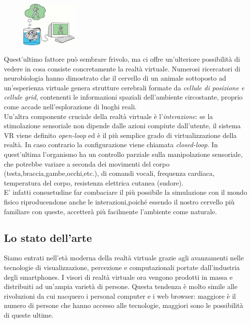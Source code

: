 \begin{figure} %
	\centering
	\includegraphics[width=0.25\textwidth]{figure/VRfool}
\end{figure}
Quest'ultimo fattore può sembrare frivolo, ma ci offre un'ulteriore possibilità di vedere in cosa consiste concretamente la realtà virtuale. Numerosi ricercatori di neurobiologia hanno dimostrato che il cervello di un animale sottoposto ad un'esperienza virtuale \mbox{genera} strutture cerebrali formate da \textit{cellule di posizione e cellule grid}, contenenti le informazioni spaziali dell'ambiente circostante, proprio come accade nell'esplorazione di luoghi reali.\\
Un'altra componente cruciale della realtà virtuale è l'\textit{interazione}: se la stimolazione sensoriale non dipende dalle azioni compiute dall'utente, il sistema VR viene definito \textit{open-loop} ed è il più semplice grado di virtualizzazione della realtà. In caso contrario la configurazione viene chiamata \textit{closed-loop}. In quest'ultima l'organismo ha un controllo parziale sulla manipolazione sensoriale, che potrebbe variare a seconda dei movimenti del corpo (testa,braccia,gambe,occhi,etc.), di comandi vocali, frequenza cardiaca, temperatura del corpo, resistenza elettrica cutanea (sudore).\\ E' infatti consuetudine far combaciare il più possibile la simulazione con il mondo fisico riproducendone anche le interazioni,poiché essendo il nostro cervello più familiare con queste, accetterà più facilmente l'ambiente come naturale.
\newpage

\subsection{Lo stato dell'arte}

Siamo entrati nell'età moderna della realtà virtuale grazie agli avanzamenti nelle tecnologie di visualizzazione, percezione e computazionali portate dall'industria degli smartphones. I visori di realtà virtuale ora vengono prodotti in massa e distribuiti ad un'ampia varietà di persone. Questa tendenza è molto simile alle rivoluzioni da cui nacquero i personal computer e i web browser: maggiore è il numero di persone che hanno accesso alle tecnologie, maggiori sono le possibilità di queste ultime.
